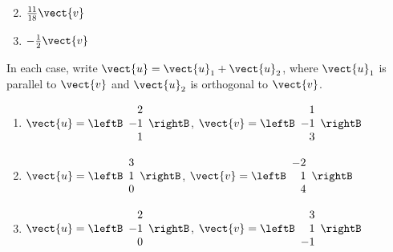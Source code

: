 \begin{multicols}{2}
\begin{ex}
\begin{enumerate}[label={\alph*.}]
\end{enumerate}
\begin{sol}
\begin{enumerate}[label={\alph*.}]
\setcounter{enumi}{1}
\item  $\frac{11}{18}\vect{v}$

\setcounter{enumi}{3}
\item  $-\frac{1}{2}\vect{v}$

\end{enumerate}
\end{sol}
\end{ex}

\begin{ex}
In each case, write $\vect{u} = \vect{u}_{1} + \vect{u}_{2}$, where $\vect{u}_{1}$ is parallel to $\vect{v}$ and $\vect{u}_{2}$ is orthogonal to $\vect{v}$.

\begin{enumerate}[label={\alph*.}]
\item $\vect{u} = \leftB
\begin{array}{r}
2\\
-1\\
1
\end{array}
\rightB$, 
$\vect{v} = \leftB
\begin{array}{r}
1\\
-1\\
3
\end{array}
\rightB
$

\item $\vect{u} = \leftB
\begin{array}{r}
3\\
1\\
0
\end{array}
\rightB$, 
$\vect{v} = \leftB
\begin{array}{r}
-2\\
1\\
4
\end{array}
\rightB
$

\item $\vect{u} = \leftB
\begin{array}{r}
2\\
-1\\
0
\end{array}
\rightB$, 
$\vect{v} = \leftB
\begin{array}{r}
3\\
1\\
-1
\end{array}
\rightB
$


\end{enumerate}
\end{ex}
\end{multicols}
